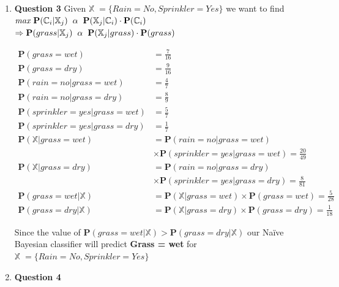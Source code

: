 \documentclass[10pt,a4paper]{article}
\newcommand{\x}{\mathbb{X}}
\newcommand{\cc}{\mathbb{C}}
\newcommand{\p}{\textbf{P}}
\begin{document}
\begin{enumerate}
		
		\clearpage
		\item \textbf{Question 3} \newline
			Given $\x \; = \{ Rain = No, Sprinkler = Yes \}$ we want to find \newline
			$\textit{max } \p(\cc_i | \x_j) \hspace*{.2cm} \alpha \hspace*{.2cm} \p(\x_j | \cc_i) \cdot \p(\cc_i) $ \newline
			$ \Rightarrow \p(grass | \x_j) \hspace*{.2cm} \alpha \hspace*{.2cm} \p(\x_j | grass) \cdot \p(grass) $ \newline
			
			\begin{equation*}
				\begin{split}
					\p(grass = wet) & = \frac{7}{16} \\
					\p(grass = dry) & = \frac{9}{16} \\
					\p(rain = no | grass = wet) & = \frac{4}{7} \\
					\p(rain = no | grass = dry) & = \frac{8}{9} \\
					\p(sprinkler = yes | grass = wet) & = \frac{5}{7} \\
					\p(sprinkler = yes | grass = dry) & = \frac{1}{7} \\
					\p(\x | grass = wet) & = \p(rain = no | grass = wet) \\ & \times \p(sprinkler = yes | grass = wet) = \frac{20}{49} \\
					\p(\x | grass = dry) & = \p(rain = no | grass = dry) \\ & \times \p(sprinkler = yes | grass = dry) = \frac{8}{81} \\
					\p(grass = wet | \x) & = \p(\x | grass = wet) \times \p(grass = wet) = \frac{5}{28} \\
					\p(grass = dry | \x) & = \p(\x | grass = dry) \times \p(grass = dry) = \frac{1}{18}
				\end{split}
			\end{equation*}
		
			Since the value of $\p(grass = wet | \x) > \p(grass = dry | \x)$ our Na$\text{\"i}$ve Bayesian classifier will predict \newline \textbf{Grass = wet} for $\x \; = \{ Rain = No, Sprinkler = Yes \}$
		
		
		\clearpage
		\item \textbf{Question 4} \newline
		

\end{enumerate}
\end{document}
